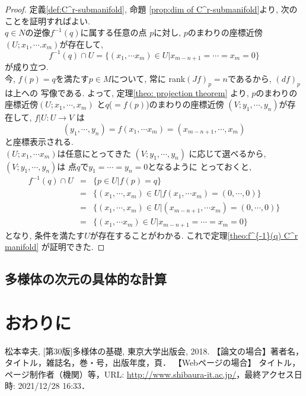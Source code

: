 \documentclass[a4j,12pt]{jarticle}
\theoremstyle{definition}
\begin{document}
\begin{proof}
    定義\ref{def:C^r-submanifold}, 命題
    \ref{prop:dim of C^r-submanifold}より, 
    次のことを証明すればよい.\\ 

    $q\in N$の逆像$f^{-1}(q)$に属する任意の点
    $p$に対し, $p$のまわりの座標近傍
    $(U;x_1,\cdots .x_m)$が存在して, 
    $$f^{-1}(q)\cap U
    =\{(x_1,\cdots x_m)\in U|
    x_{m-n+1}=\cdots =x_m=0\}$$
    が成り立つ. \\

    今, $f(p)=q$を満たす$p\in M$について, 常に
    rank$(Jf)_p=n$であるから, $(df)_p$は上への
    写像である. よって, 定理\ref{theo: projection theorem}
    より, $p$のまわりの座標近傍$(U;x_1,\cdots ,x_m)$
    と$q$($=f(p)$)のまわりの座標近傍
    $(V;y_1,\cdots ,y_n)$が存在して, $f|U:U\to V$
    は
    $$(y_1,\cdots ,y_n)=f(x_1,\cdots x_m)
    =(x_{m-n+1},\cdots ,x_m)$$
    と座標表示される. \\
    $(U;x_1,\cdots x_m)$は任意にとってきた
    $(V;y_1,\cdots ,y_n)$
    に応じて選べるから, $(V;y_1,\cdots ,y_n)$は
    点$q$で$y_1=\cdots =y_n=0$となるように
    とっておくと, 
    \begin{eqnarray*}
        f^{-1}(q)\cap U&=& \{p\in U|f(p)=q\}\\
        &=&\{(x_1,\cdots ,x_m)\in U|f(x_1,\cdots x_m)=(0,\cdots ,0)\}\\
        &=&\{(x_1,\cdots ,x_m)\in U|(x_{m-n+1},\cdots x_m)=(0,\cdots ,0)\}\\
        &=&\{(x_1,\cdots x_m)\in U|x_{m-n+1}=\cdots =x_m=0\}
    \end{eqnarray*}
    となり, 条件を満たす$U$が存在することがわかる. 
    これで定理\ref{theo:f^{-1}(q) C^r manifold}
    が証明できた. 
\end{proof}
\subsection{多様体の次元の具体的な計算}
\newpage
%
\section{おわりに}
\newpage
\begin{thebibliography}{99}
 松本幸夫, [第30版]多様体の基礎, 東京大学出版会, 2018.
【論文の場合】著者名，タイトル，雑誌名，巻・号，出版年度，頁．
【Webページの場合】 タイトル，ページ制作者（機関）等，URL: \url{http://www.shibaura-it.ac.jp/}，最終アクセス日時: 2021/12/28 16:33．
\end{thebibliography}
\end{document}

